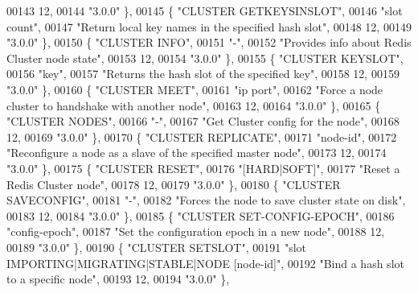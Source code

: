 \begin{DoxyCode}
00143     12,
00144     \textcolor{stringliteral}{"3.0.0"} \},
00145     \{ \textcolor{stringliteral}{"CLUSTER GETKEYSINSLOT"},
00146     \textcolor{stringliteral}{"slot count"},
00147     \textcolor{stringliteral}{"Return local key names in the specified hash slot"},
00148     12,
00149     \textcolor{stringliteral}{"3.0.0"} \},
00150     \{ \textcolor{stringliteral}{"CLUSTER INFO"},
00151     \textcolor{stringliteral}{"-"},
00152     \textcolor{stringliteral}{"Provides info about Redis Cluster node state"},
00153     12,
00154     \textcolor{stringliteral}{"3.0.0"} \},
00155     \{ \textcolor{stringliteral}{"CLUSTER KEYSLOT"},
00156     \textcolor{stringliteral}{"key"},
00157     \textcolor{stringliteral}{"Returns the hash slot of the specified key"},
00158     12,
00159     \textcolor{stringliteral}{"3.0.0"} \},
00160     \{ \textcolor{stringliteral}{"CLUSTER MEET"},
00161     \textcolor{stringliteral}{"ip port"},
00162     \textcolor{stringliteral}{"Force a node cluster to handshake with another node"},
00163     12,
00164     \textcolor{stringliteral}{"3.0.0"} \},
00165     \{ \textcolor{stringliteral}{"CLUSTER NODES"},
00166     \textcolor{stringliteral}{"-"},
00167     \textcolor{stringliteral}{"Get Cluster config for the node"},
00168     12,
00169     \textcolor{stringliteral}{"3.0.0"} \},
00170     \{ \textcolor{stringliteral}{"CLUSTER REPLICATE"},
00171     \textcolor{stringliteral}{"node-id"},
00172     \textcolor{stringliteral}{"Reconfigure a node as a slave of the specified master node"},
00173     12,
00174     \textcolor{stringliteral}{"3.0.0"} \},
00175     \{ \textcolor{stringliteral}{"CLUSTER RESET"},
00176     \textcolor{stringliteral}{"[HARD|SOFT]"},
00177     \textcolor{stringliteral}{"Reset a Redis Cluster node"},
00178     12,
00179     \textcolor{stringliteral}{"3.0.0"} \},
00180     \{ \textcolor{stringliteral}{"CLUSTER SAVECONFIG"},
00181     \textcolor{stringliteral}{"-"},
00182     \textcolor{stringliteral}{"Forces the node to save cluster state on disk"},
00183     12,
00184     \textcolor{stringliteral}{"3.0.0"} \},
00185     \{ \textcolor{stringliteral}{"CLUSTER SET-CONFIG-EPOCH"},
00186     \textcolor{stringliteral}{"config-epoch"},
00187     \textcolor{stringliteral}{"Set the configuration epoch in a new node"},
00188     12,
00189     \textcolor{stringliteral}{"3.0.0"} \},
00190     \{ \textcolor{stringliteral}{"CLUSTER SETSLOT"},
00191     \textcolor{stringliteral}{"slot IMPORTING|MIGRATING|STABLE|NODE [node-id]"},
00192     \textcolor{stringliteral}{"Bind a hash slot to a specific node"},
00193     12,
00194     \textcolor{stringliteral}{"3.0.0"} \},

\end{DoxyCode}
